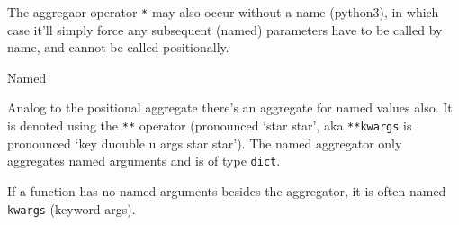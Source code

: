 \begin{frame}[fragile]

The aggregaor operator \texttt{*} may also occur without a name
(python3), in which case it'll simply force any subsequent (named)
parameters have to be called by name, and cannot be called positionally.

\begin{Shaded}
\begin{Highlighting}[]
 \OperatorTok{*}\OperatorTok{=}\NormalTok{):}
\end{Highlighting}
\end{Shaded}

\end{frame}

\begin{frame}[fragile]

\begin{block}{Named}

Analog to the positional aggregate there's an aggregate for named values
also. It is denoted using the \texttt{**} operator (pronounced `star
star', aka \texttt{**kwargs} is pronounced `key duouble u args star
star'). The named aggregator only aggregates named arguments and is of
type \texttt{dict}.

\begin{Shaded}
\begin{Highlighting}[]
 \OperatorTok{**}

\NormalTok{)  }
\OperatorTok{=}\NormalTok{)  }
\OperatorTok{=}\NormalTok{)  }
\OperatorTok{=}\OperatorTok{=}\OperatorTok{=}\NormalTok{)  }
\end{Highlighting}
\end{Shaded}

If a function has no named arguments besides the aggregator, it is often
named \texttt{kwargs} (keyword args).

\end{block}

\end{frame}

